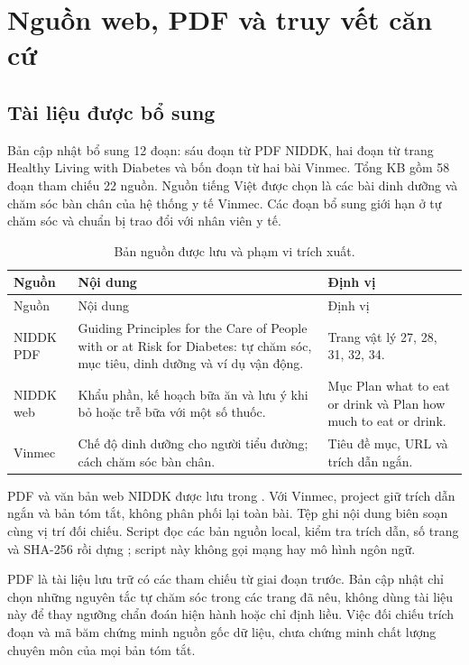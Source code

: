 \section{Nguồn web, PDF và truy vết căn cứ}
\subsection{Tài liệu được bổ sung}
Bản cập nhật bổ sung 12 đoạn: sáu đoạn từ PDF NIDDK, hai đoạn từ trang Healthy Living with Diabetes và bốn đoạn từ hai bài Vinmec. Tổng KB gồm 58 đoạn tham chiếu 22 nguồn. Nguồn tiếng Việt được chọn là các bài dinh dưỡng và chăm sóc bàn chân của hệ thống y tế Vinmec. Các đoạn bổ sung giới hạn ở tự chăm sóc và chuẩn bị trao đổi với nhân viên y tế.

\begin{longtable}{p{3cm}p{6.5cm}p{4.3cm}}\caption{Bản nguồn được lưu và phạm vi trích xuất.}\\\toprule Nguồn & Nội dung & Định vị\\\midrule\endfirsthead\toprule Nguồn & Nội dung & Định vị\\\midrule\endhead
NIDDK PDF & Guiding Principles for the Care of People with or at Risk for Diabetes: tự chăm sóc, mục tiêu, dinh dưỡng và ví dụ vận động. & Trang vật lý 27, 28, 31, 32, 34.\\
NIDDK web & Khẩu phần, kế hoạch bữa ăn và lưu ý khi bỏ hoặc trễ bữa với một số thuốc. & Mục Plan what to eat or drink và Plan how much to eat or drink.\\
Vinmec & Chế độ dinh dưỡng cho người tiểu đường; cách chăm sóc bàn chân. & Tiêu đề mục, URL và trích dẫn ngắn.\\\bottomrule\end{longtable}

PDF và văn bản web NIDDK được lưu trong . Với Vinmec, project giữ trích dẫn ngắn và bản tóm tắt, không phân phối lại toàn bài. Tệp  ghi nội dung biên soạn cùng vị trí đối chiếu. Script  đọc các bản nguồn local, kiểm tra trích dẫn, số trang và SHA-256 rồi dựng ; script này không gọi mạng hay mô hình ngôn ngữ.

PDF là tài liệu lưu trữ có các tham chiếu từ giai đoạn trước. Bản cập nhật chỉ chọn những nguyên tắc tự chăm sóc trong các trang đã nêu, không dùng tài liệu này để thay ngưỡng chẩn đoán hiện hành hoặc chỉ định liều. Việc đối chiếu trích đoạn và mã băm chứng minh nguồn gốc dữ liệu, chưa chứng minh chất lượng chuyên môn của mọi bản tóm tắt.

